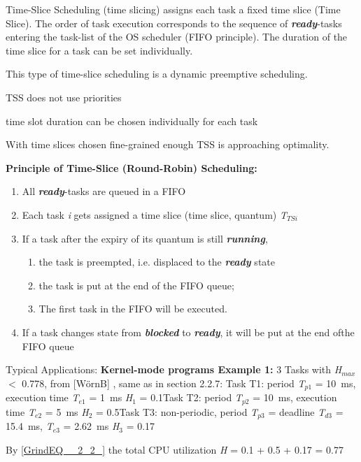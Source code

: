 Time-Slice Scheduling (time slicing) assigns each task a fixed time slice (Time Slice). The order of task execution corresponds to the sequence of \textbf{\textit{ready}}-tasks entering the task-list of the OS scheduler (FIFO principle). The duration of the time slice for a task can be set individually.


This type of time-slice scheduling is a dynamic preemptive scheduling. 

 TSS does not use priorities

 time slot duration can be chosen individually for each task

 With time slices chosen fine-grained enough TSS is approaching optimality.

\textbf{Principle of Time-Slice (Round-Robin) Scheduling: }

\begin{enumerate}
	\item  All \textbf{\textit{ready}}-tasks are queued in a FIFO 
	\item  Each task \textit{i} gets assigned a time slice (time slice, quantum) \textit{T${}_{TSi}$}
	\item  If a task after the expiry of its quantum is still \textbf{\textit{running}},
	\begin{enumerate}
		\item  the task is preempted, i.e. displaced to the \textbf{\textit{ready}} state
		\item  the task is put at the end of the FIFO queue;
		\item  The first task in the FIFO will be executed.
	\end{enumerate}
	\item  If a task changes state from \textbf{\textit{blocked}} to \textbf{\textit{ready}}, it will be put at the end ofthe FIFO queue
\end{enumerate}

Typical Applications: \textbf{Kernel-mode programs  Example 1:} 3 Tasks with \textit{H}${}_{max}$ $\mathrm{<}$ 0.778, from [W\"{o}rnB] , same as in section 2.2.7: Task T1: period \textit{T}${}_{p1}$ = 10~ms, execution time \textit{T}${}_{e1}$ = 1~ms  \textit{H}${}_{1}$ = 0.1Task T2: period \textit{T}${}_{p2}$ = 10~ms, execution time\textit{ T}${}_{e2}$ = 5~ms  \textit{H}${}_{2}$ = 0.5Task T3: non-periodic, period \textit{T}${}_{p3}$ = deadline \textit{T}${}_{d3}$ = 15.4~ms, \textit{T}${}_{e3}$ = 2.62~ms  \textit{H}${}_{3}$ = 0.17

By \eqref{GrindEQ__2_2_} the total CPU utilization \textit{H} = 0.1 + 0.5 + 0.17 = 0.77 

